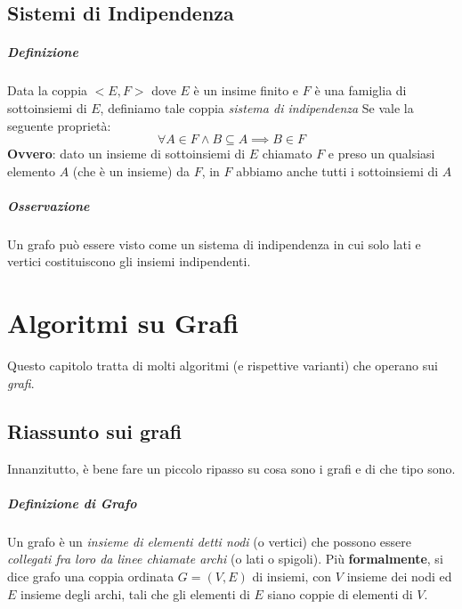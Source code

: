 \documentclass[12pt, a4paper, openany]{book}
\begin{document}
\section{Sistemi di Indipendenza}
\paragraph*{Definizione} Data la coppia $<E,F>$ dove $E$ è un insime finito e $F$ è una famiglia di sottoinsiemi di $E$, definiamo tale coppia \emph{sistema di indipendenza} Se vale la seguente proprietà:
$$\forall A \in F \wedge B\subseteq A \implies B \in F$$
\textbf{Ovvero}: dato un insieme di sottoinsiemi di $E$ chiamato $F$ e preso un qualsiasi elemento $A$ (che è un insieme) da $F$, in $F$ abbiamo anche tutti i sottoinsiemi di $A$

\paragraph*{Osservazione} Un grafo può essere visto come un sistema di indipendenza in cui solo lati e vertici costituiscono gli insiemi indipendenti.

\chapter{Algoritmi su Grafi}
Questo capitolo tratta di molti algoritmi (e rispettive varianti) che operano sui \emph{grafi}.

\section{Riassunto sui grafi}
Innanzitutto, è bene fare un piccolo ripasso su cosa sono i grafi e di che tipo sono.

\paragraph{Definizione di Grafo} Un grafo è un \emph{insieme di elementi detti nodi} (o vertici) che possono essere \emph{collegati fra loro da linee chiamate archi} (o lati o spigoli).
Più \textbf{formalmente}, si dice grafo una coppia ordinata $G=(V,E)$ di insiemi, con $V$ insieme dei nodi ed $E$ insieme degli archi, tali che gli elementi di $E$ siano coppie di elementi di $V$.
\end{document}
